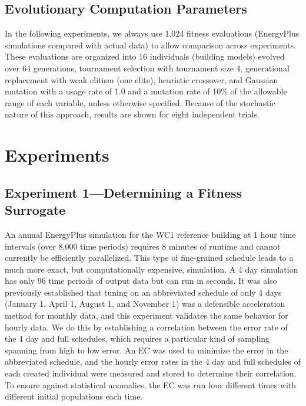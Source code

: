 \documentclass[preprint, review, 12pt]{elsarticle}
\begin{document}
\subsection{Evolutionary Computation Parameters}
In the following experiments, we always use 1,024 fitness evaluations (EnergyPlus simulations compared with actual data) to allow comparison across experiments. These evaluations are organized into 16 individuals (building models) evolved over 64 generations, tournament selection with tournament size 4, generational replacement with weak elitism (one elite), heuristic crossover, and Gaussian mutation with a usage rate of 1.0 and a mutation rate of 10\% of the allowable range of each variable, unless otherwise specified. Because of the stochastic nature of this approach, results are shown for eight independent trials.



\section{Experiments}
\label{sec:hourly}

\subsection{Experiment 1---Determining a Fitness Surrogate}
\label{sub:experiment1}
An annual EnergyPlus simulation for the WC1 reference building at 1 hour time intervals (over 8,000 time periods) requires 8 minutes of runtime and cannot currently be efficiently parallelized. This type of fine-grained schedule leads to a much more exact, but computationally expensive, simulation. A 4 day simulation has only 96 time periods of output data but can run in seconds. It was also previously established \cite{cit:garrett2013} that tuning on an abbreviated schedule of only 4 days (January 1, April 1, August 1, and November 1) was a defensible acceleration method for monthly data, and this experiment validates the same behavior for hourly data. We do this by establishing a correlation between the error rate of the 4 day and full schedules, which requires a particular kind of sampling spanning from high to low error. An EC was used to minimize the error in the abbreviated schedule, and the hourly error rates in the 4 day and full schedules of each created individual were measured and stored to determine their correlation. To ensure against statistical anomalies, the EC was run four different times with different initial populations each time.
\end{document}
